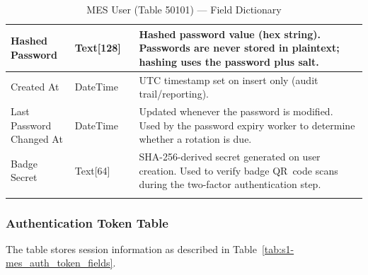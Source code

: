 \begin{longtable}{@{} P{0.18\linewidth} P{0.18\linewidth} P{0.64\linewidth} @{}}
	Hashed Password   & Text[128]                     &                      
	Hashed password value (hex string). Passwords are never stored in plaintext; hashing uses the password plus salt. \\
	\midrule
	
	Created At        & DateTime                      &                      
	UTC timestamp set on insert only (audit trail/reporting). \\
	\midrule
	Last Password Changed At & DateTime               &
	Updated whenever the password is modified. Used by the password expiry worker to determine whether a rotation is due. \\
	\midrule

	Badge Secret      & Text[64]                      &
	SHA-256-derived secret generated on user creation. Used to verify badge QR~code scans during the two-factor authentication step. \\
	\midrule
	\noalign{\vskip 4pt}
	\caption{MES User (Table 50101) --- Field Dictionary}
	\label{tab:s1-mes_user_fields}
	
\end{longtable}

\subsubsection*{Authentication Token Table}

The  table stores session information as described
in Table~\ref{tab:s1-mes_auth_token_fields}.

